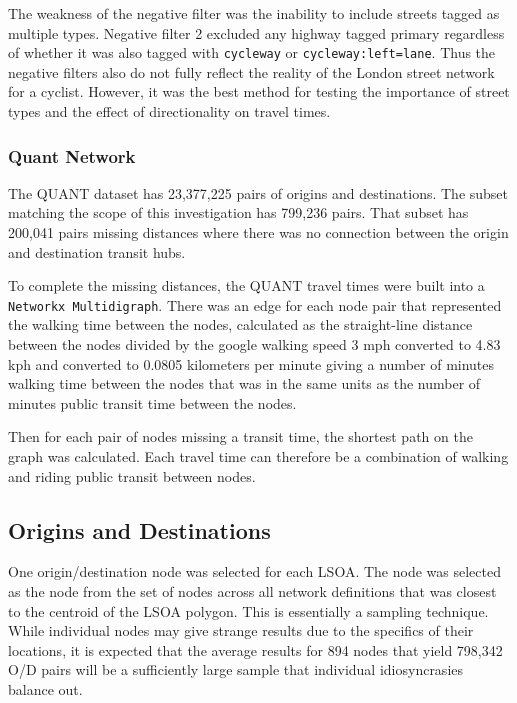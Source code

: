 The weakness of the negative filter was the inability to include streets tagged as multiple types. Negative filter 2 excluded any highway tagged primary regardless of whether it was also tagged with \texttt{cycleway} or \texttt{cycleway:left=lane}. Thus the negative filters also do not fully reflect the reality of the London street network for a cyclist. However, it was the best method for testing the importance of street types and the effect of directionality on travel times. 


\subsubsection{Quant Network}

The QUANT dataset has 23,377,225 pairs of origins and destinations. The subset matching the scope of this investigation has 799,236 pairs. That subset has 200,041 pairs missing distances where there was no connection between the origin and destination transit hubs.

To complete the missing distances, the QUANT travel times were built into a \texttt{Networkx Multidigraph}. There was an edge for each node pair that represented the walking time between the nodes, calculated as the straight-line distance between the nodes divided by the google walking speed 3 mph converted to 4.83 kph and converted to 0.0805 kilometers per minute giving a number of minutes walking time between the nodes that was in the same units as the number of minutes public transit time between the nodes. 

Then for each pair of nodes missing a transit time, the shortest path on the graph was calculated. Each travel time can therefore be a combination of walking and riding public transit between nodes. 

\subsection{Origins and Destinations}

One origin/destination node was selected for each LSOA. The node was selected as the node from the set of nodes across all network definitions that was closest to the centroid of the LSOA polygon. This is essentially a sampling technique. While individual nodes may give strange results due to the specifics of their locations, it is expected that the average results for 894 nodes that yield 798,342 O/D pairs will be a sufficiently large sample that individual idiosyncrasies balance out. 

